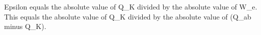 Epsilon equals the absolute value of Q_K divided by the absolute value of W_e.  
This equals the absolute value of Q_K divided by the absolute value of (Q_ab minus Q_K).